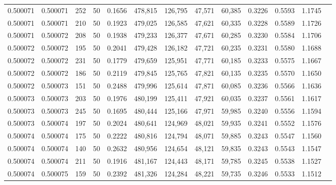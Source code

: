 \begin{tabular}{rrrrrrrrrrrrr}
0.500071 & 0.500071 &   252 &  50 &                                     0.1656 & 478,815 & 126,795 &  47,571 &  60,385 & 0.3226 & 0.5593 & 1.1745 \\
0.500071 & 0.500071 &   210 &  50 &                                     0.1923 & 479,025 & 126,585 &  47,621 &  60,335 & 0.3228 & 0.5589 & 1.1726 \\
0.500071 & 0.500072 &   208 &  50 &                                     0.1938 & 479,233 & 126,377 &  47,671 &  60,285 & 0.3230 & 0.5584 & 1.1706 \\
0.500072 & 0.500072 &   195 &  50 &                                     0.2041 & 479,428 & 126,182 &  47,721 &  60,235 & 0.3231 & 0.5580 & 1.1688 \\
0.500072 & 0.500072 &   231 &  50 &                                     0.1779 & 479,659 & 125,951 &  47,771 &  60,185 & 0.3233 & 0.5575 & 1.1667 \\
0.500072 & 0.500072 &   186 &  50 &                                     0.2119 & 479,845 & 125,765 &  47,821 &  60,135 & 0.3235 & 0.5570 & 1.1650 \\
0.500072 & 0.500073 &   151 &  50 &                                     0.2488 & 479,996 & 125,614 &  47,871 &  60,085 & 0.3236 & 0.5566 & 1.1636 \\
0.500073 & 0.500073 &   203 &  50 &                                     0.1976 & 480,199 & 125,411 &  47,921 &  60,035 & 0.3237 & 0.5561 & 1.1617 \\
0.500073 & 0.500073 &   245 &  50 &                                     0.1695 & 480,444 & 125,166 &  47,971 &  59,985 & 0.3240 & 0.5556 & 1.1594 \\
0.500073 & 0.500074 &   197 &  50 &                                     0.2024 & 480,641 & 124,969 &  48,021 &  59,935 & 0.3241 & 0.5552 & 1.1576 \\
0.500074 & 0.500074 &   175 &  50 &                                     0.2222 & 480,816 & 124,794 &  48,071 &  59,885 & 0.3243 & 0.5547 & 1.1560 \\
0.500074 & 0.500074 &   140 &  50 &                                     0.2632 & 480,956 & 124,654 &  48,121 &  59,835 & 0.3243 & 0.5543 & 1.1547 \\
0.500074 & 0.500074 &   211 &  50 &                                     0.1916 & 481,167 & 124,443 &  48,171 &  59,785 & 0.3245 & 0.5538 & 1.1527 \\
0.500074 & 0.500075 &   159 &  50 &                                     0.2392 & 481,326 & 124,284 &  48,221 &  59,735 & 0.3246 & 0.5533 & 1.1512 \\

\end{tabular}
